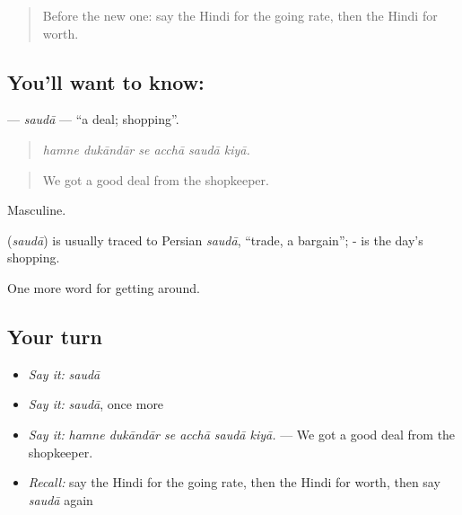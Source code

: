 \label{lesson:HI-C431-sauda}



\begin{quote}
Before the new one: say the Hindi for the going rate, then the Hindi for worth.
\end{quote}

\subsection*{You'll want to know: }
\textbf{} — \emph{saudā} — \textquotedblleft{}a deal; shopping\textquotedblright{}.

\begin{quote}
     
\end{quote}

\begin{quote}
\emph{hamne dukāndār se acchā saudā kiyā.}
\end{quote}

\begin{quote}
We got a good deal from the shopkeeper.
\end{quote}

Masculine.

\begin{cousinweb}
\textbf{} (\emph{saudā}) is usually traced to Persian \emph{saudā}, \textquotedblleft{}trade, a bargain\textquotedblright{}; - is the day's shopping.
\end{cousinweb}

\begin{grammarlens}[title={What you've built}]
One more word for getting around.
\end{grammarlens}

\subsection*{Your turn}
\begin{itemize}
\raggedright
  \item \emph{Say it:} \emph{saudā}
  \item \emph{Say it:} \emph{saudā}, once more
  \item \emph{Say it:} \emph{hamne dukāndār se acchā saudā kiyā.} — We got a good deal from the shopkeeper.
  \item \emph{Recall:} say the Hindi for the going rate, then the Hindi for worth, then say \emph{saudā} again
\end{itemize}

